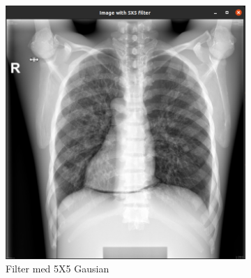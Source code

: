 \documentclass{article}
\begin{document}
\begin{figure}[H]
\begin{subfigure}[b]{0.49\textwidth}
    \includegraphics[width=\textwidth]{Image/Image5X5.png}
    \caption{Filter med 5X5 Gausian}
    \label{fig:f6}
  \end{subfigure}
      \caption{}
    \label{fig:image3}
\end{figure}
\end{document}

